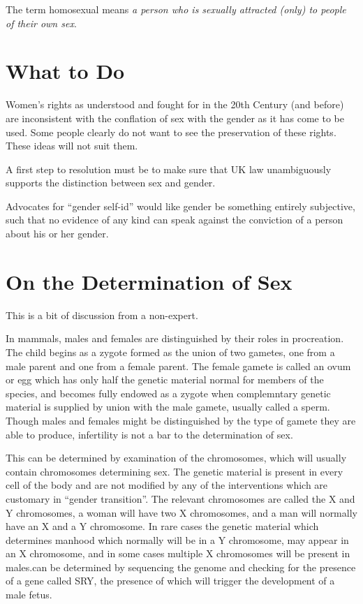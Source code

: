 \documentclass[10pt,titlepage]{book}
\begin{document}
The term homosexual means \emph{a person who is sexually attracted (only) to people of their own sex}.

\section{What to Do}

Women's rights as understood and fought for in the 20th Century (and before) are inconsistent with the conflation of sex with the gender as it has come to be used.
Some people clearly do not want to see the preservation of these rights.
These ideas will not suit them.

A first step to resolution must be to make sure that UK law unambiguously supports the distinction between sex and gender.

Advocates for ``gender self-id'' would like gender be something entirely subjective, such that no evidence of any kind can speak against the conviction of a person about his or her gender.

\section{On the Determination of Sex}

This is a bit of discussion from a non-expert.

In mammals, males and females are distinguished by their roles in procreation.
The child begins as a zygote formed as the union of two gametes, one from a male parent and one from a female parent.
The female gamete is called an ovum or egg which has only half the genetic material normal for members of the species, and becomes fully endowed as a zygote when complemntary genetic material is supplied by union with the male gamete, usually called a sperm.
Though males and females might be distinguished by the type of gamete they are able to produce, infertility is not a bar to the determination of sex.

This can be determined by examination of the chromosomes, which will usually contain chromosomes determining sex.
The genetic material is present in every cell of the body and are not modified by any of the interventions which are customary in ``gender transition''.
The relevant chromosomes are called the X and Y chromosomes, a woman will have two X chromosomes, and a man will normally have an X and a Y chromosome.
In rare cases the genetic material which determines manhood which normally will be in a Y chromosome, may appear in an X chromosome, and in some cases multiple X chromosomes will be present in males.can be determined by sequencing the genome and checking for the presence of a gene called SRY, the presence of which will trigger the development of a male fetus.
\end{document}
